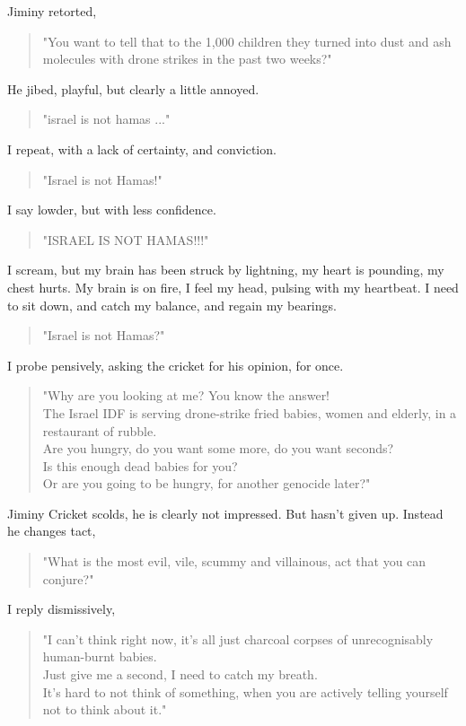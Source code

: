 \documentclass[16pt,openany,oneside]{book}
\begin{document}
Jiminy retorted,
\begin{quote}
    "You want to tell that to the 1,000 children they turned into dust and ash molecules with drone strikes in the past two weeks?"
\end{quote}
He jibed, playful, but clearly a little annoyed.
\begin{quote}
    "israel is not hamas ..."
\end{quote} 
I repeat, with a lack of certainty, and conviction.
\begin{quote}
    "Israel is not Hamas!"
\end{quote}    
I say lowder, but with less confidence.
\begin{quote}
    "ISRAEL IS NOT HAMAS!!!"
\end{quote}    
I scream, but my brain has been struck by lightning, my heart is pounding, my chest hurts.
My brain is on fire, I feel my head, pulsing with my heartbeat.
I need to sit down, and catch my balance, and regain my bearings.
\begin{quote}
    "Israel is not Hamas?"
\end{quote}    
I probe pensively, asking the cricket for his opinion, for once.
\begin{quote}
    "Why are you looking at me? You know the answer!
    \\
     The Israel IDF is serving drone-strike fried babies, women and elderly, in a restaurant of rubble.
    \\
     Are you hungry, do you want some more, do you want seconds? 
    \\
     Is this enough dead babies for you? 
    \\
     Or are you going to be hungry, for another genocide later?"
\end{quote}     
Jiminy Cricket scolds, he is clearly not impressed. But hasn't given up.
Instead he changes tact, 
\begin{quote}
    "What is the most evil, vile, scummy and villainous, act that you can conjure?"
\end{quote}
I reply dismissively,
\begin{quote}
    "I can't think right now, it's all just charcoal corpses of unrecognisably human-burnt babies.
    \\
     Just give me a second, I need to catch my breath.
    \\
     It's hard to not think of something, when you are actively telling yourself not to think about it."
\end{quote}     
\end{document}
